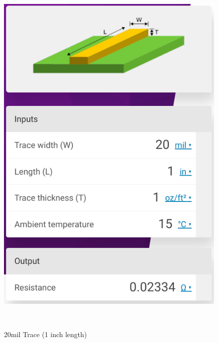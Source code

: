 \documentclass[a4paper,11pt]{article}%
\begin{document}
\begin{figure}[H]
\centering
\begin{minipage}[b]{0.45\linewidth}
	\includegraphics[scale=0.4]{figures/20}
	\caption{20mil Trace (1 inch length) }
\end{minipage}
\
\begin{minipage}[b]{0.45\linewidth}

\end{minipage}
\end{figure}
\end{document}
